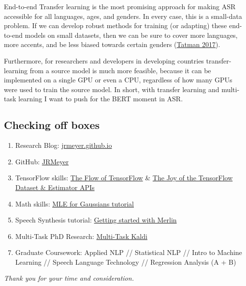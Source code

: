 \documentclass[12pt,a4paper]{article}
\begin{document}
End-to-end Transfer learning is the most promising approach for making ASR accessible for all languages, ages, and genders. In every case, this is a small-data problem. If we can develop robust methods for training (or adapting) these end-to-end models on small datasets, then we can be sure to cover more languages, more accents, and be less biased towards certain genders (\href{http://www.aclweb.org/anthology/W17-1606}{Tatman 2017}).

Furthermore, for researchers and developers in developing countries transfer-learning from a source model is much more feasible, because it can be implemented on a single GPU or even a CPU, regardless of how many GPUs were used to train the source model. In short, with transfer learning and multi-task learning I want to push for the BERT moment in ASR.



\subsection*{Checking off boxes}

\begin{enumerate}

\item Research Blog: \href{http://jrmeyer.github.io}{jrmeyer.github.io}

\item GitHub: \href{https://github.com/JRMeyer}{JRMeyer}
  
\item TensorFlow skills: \href{http://jrmeyer.github.io/machinelearning/2016/02/01/TensorFlow-Tutorial.html}{The Flow of TensorFlow} \& \href{http://jrmeyer.github.io/machinelearning/2019/05/29/tensorflow-dataset-estimator-api.html}{The Joy of the TensorFlow Dataset \& Estimator APIs}
  
\item Math skills: \href{http://jrmeyer.github.io/machinelearning/2017/08/18/mle.html}{MLE for Gaussians tutorial}

\item Speech Synthesis tutorial: \href{http://jrmeyer.github.io/tts/2017/02/14/Installing-Merlin.html}{Getting started with Merlin}

\item Multi-Task PhD Research: \href{https://github.com/JRMeyer/multi-task-kaldi}{Multi-Task Kaldi}
  
\item Graduate Coursework: Applied NLP // Statistical NLP // Intro to Machine Learning // Speech Language Technology // Regression Analysis (A + B)


\end{enumerate}

\vspace{.25cm}

\begin{center}
\textit{Thank you for your time and consideration.}  
\end{center}
\end{document}
